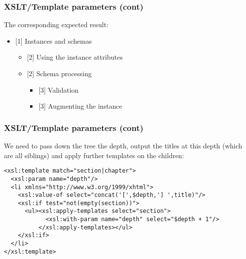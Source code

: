 %
\begin{frame}
\frametitle{XSLT/Template parameters (cont)}

The corresponding expected result:
\begin{itemize}

  \item {[1]} Instances and schemas
    \begin{itemize}

      \item {[2]} Using the instance attributes

      \item {[2]} Schema processing
        \begin{itemize}

          \item {[3]} Validation

          \item {[3]} Augmenting the instance

        \end{itemize}

    \end{itemize}

\end{itemize}

\end{frame}


%
\begin{frame}[containsverbatim]
\frametitle{XSLT/Template parameters (cont)}

We need to pass down the tree the depth, output the titles at this
depth (which are all siblings) and apply further templates on the
children:
{\small
\begin{verbatim}
<xsl:template match="section|chapter">
  <xsl:param name="depth"/>
  <li xmlns="http://www.w3.org/1999/xhtml">
    <xsl:value-of select="concat('[',$depth,'] ',title)"/>
    <xsl:if test="not(empty(section))">
      <ul><xsl:apply-templates select="section">
            <xsl:with-param name="depth" select="$depth + 1"/>
          </xsl:apply-templates></ul>
    </xsl:if>
  </li>
</xsl:template>
\end{verbatim}
}

\end{frame}


